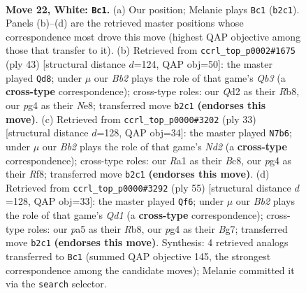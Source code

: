 \documentclass[11pt]{article}
\begin{document}
\clearpage

\begin{figure}[p]\centering
\begin{subfigure}{0.46\textwidth}\centering
\resizebox{\linewidth}{!}{%
\newchessgame
\chessboard[
  setfen={2rqr3/4bp1k/2n2n2/p6p/1p1p2p1/1P1P2P1/PBRQ1P1P/RN2N1K1 w - - 0 22},
  showmover=false,
  pgfstyle=straightmove, color=movearrow, markmove={b2-c1}
]}
\caption{}
\end{subfigure}\hfill
\begin{subfigure}{0.46\textwidth}\centering
\resizebox{\linewidth}{!}{%
\newchessgame
\chessboard[
  setfen={1rr1n1k1/p2b1p1p/1q1p2p1/p2Pp3/4P2b/1PN2P2/P2BQ1PP/2RR1N1K b - - 14 22},
  showmover=false,
  pgfstyle=straightmove, color=movearrow, markmove={b6-d8}
]}
\caption{}
\end{subfigure}
\\[4pt]
\begin{subfigure}{0.46\textwidth}\centering
\resizebox{\linewidth}{!}{%
\newchessgame
\chessboard[
  setfen={r1b2rk1/3nqppp/2p1p3/p2nP3/3PN3/5NP1/5PBP/R2QR1K1 b - - 1 17},
  showmover=false,
  pgfstyle=straightmove, color=movearrow, markmove={d7-b6}
]}
\caption{}
\end{subfigure}\hfill
\begin{subfigure}{0.46\textwidth}\centering
\resizebox{\linewidth}{!}{%
\newchessgame
\chessboard[
  setfen={1rrq2k1/3n1pbn/p2p2pp/PppP3P/4P1P1/4NPN1/1PQ5/3RBR1K b - - 0 28},
  showmover=false,
  pgfstyle=straightmove, color=movearrow, markmove={d8-f6}
]}
\caption{}
\end{subfigure}
\caption{\textbf{Move 22, White: \texttt{Bc1}.} (a) Our position; Melanie plays \texttt{Bc1} (\texttt{b2c1}). Panels (b)--(d) are the retrieved master positions whose correspondence most drove this move (highest QAP objective among those that transfer to it). (b) Retrieved from \texttt{ccrl\_top\_p0002\#1675} (ply 43) [structural distance $d$=124, QAP obj=50]: the master played \texttt{Qd8}; under $\mu$ our \emph{Bb2} plays the role of that game's \emph{Qb3} (a \textbf{cross-type} correspondence); cross-type roles: our \emph{Q}d2 as their \emph{R}b8, our \emph{p}g4 as their \emph{N}e8; transferred move \texttt{b2c1} \textbf{(endorses this move)}. (c) Retrieved from \texttt{ccrl\_top\_p0000\#3202} (ply 33) [structural distance $d$=128, QAP obj=34]: the master played \texttt{N7b6}; under $\mu$ our \emph{Bb2} plays the role of that game's \emph{Nd2} (a \textbf{cross-type} correspondence); cross-type roles: our \emph{R}a1 as their \emph{B}c8, our \emph{p}g4 as their \emph{R}f8; transferred move \texttt{b2c1} \textbf{(endorses this move)}. (d) Retrieved from \texttt{ccrl\_top\_p0000\#3292} (ply 55) [structural distance $d$=128, QAP obj=33]: the master played \texttt{Qf6}; under $\mu$ our \emph{Bb2} plays the role of that game's \emph{Qd1} (a \textbf{cross-type} correspondence); cross-type roles: our \emph{p}a5 as their \emph{R}b8, our \emph{p}g4 as their \emph{B}g7; transferred move \texttt{b2c1} \textbf{(endorses this move)}. Synthesis: 4 retrieved analogs transferred to \texttt{Bc1} (summed QAP objective 145, the strongest correspondence among the candidate moves); Melanie committed it via the \texttt{search} selector.}
\label{fig:thought-m42}
\end{figure}
\end{document}
